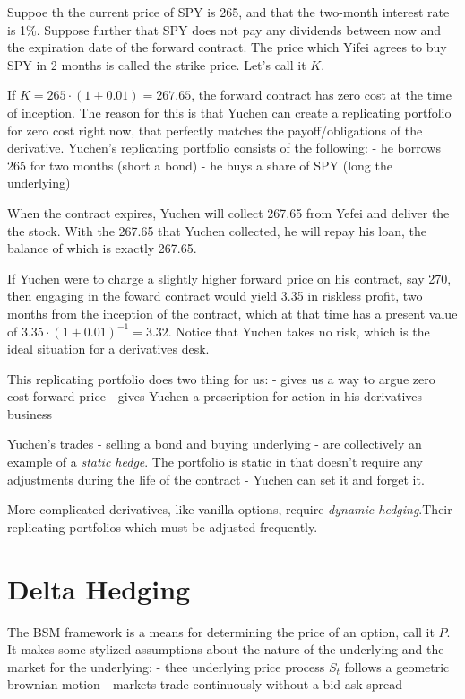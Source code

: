 \documentclass[11pt,]{krantz}
\begin{document}
Suppoe th the current price of SPY is 265, and that the two-month interest rate is 1\%. Suppose further that SPY does not pay any dividends between now and the expiration date of the forward contract. The price which Yifei agrees to buy SPY in 2 months is called the strike price. Let's call it \(K\).

If \(K = 265 \cdot (1 + 0.01) = 267.65\), the forward contract has zero cost at the time of inception. The reason for this is that Yuchen can create a replicating portfolio for zero cost right now, that perfectly matches the payoff/obligations of the derivative. Yuchen's replicating portfolio consists of the following: - he borrows 265 for two months (short a bond) - he buys a share of SPY (long the underlying)

When the contract expires, Yuchen will collect 267.65 from Yefei and deliver the the stock. With the 267.65 that Yuchen collected, he will repay his loan, the balance of which is exactly 267.65.

If Yuchen were to charge a slightly higher forward price on his contract, say 270, then engaging in the foward contract would yield 3.35 in riskless profit, two months from the inception of the contract, which at that time has a present value of \(3.35 \cdot (1 + 0.01)^{-1} = 3.32\). Notice that Yuchen takes no risk, which is the ideal situation for a derivatives desk.

This replicating portfolio does two thing for us: - gives us a way to argue zero cost forward price - gives Yuchen a prescription for action in his derivatives business

Yuchen's trades - selling a bond and buying underlying - are collectively an example of a \emph{static hedge}. The portfolio is static in that doesn't require any adjustments during the life of the contract - Yuchen can set it and forget it.

More complicated derivatives, like vanilla options, require \emph{dynamic hedging}.Their replicating portfolios which must be adjusted frequently.

\section{Delta Hedging}\label{delta-hedging}

The BSM framework is a means for determining the price of an option, call it \(P\). It makes some stylized assumptions about the nature of the underlying and the market for the underlying: - thee underlying price process \(S_{t}\) follows a geometric brownian motion - markets trade continuously without a bid-ask spread
\end{document}
